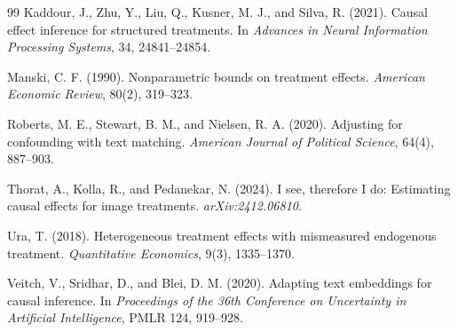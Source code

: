 \documentclass[11pt]{article}
\theoremstyle{definition}
\theoremstyle{plain}
\theoremstyle{remark}
\begin{document}
\begin{thebibliography}{99}
Kaddour, J., Zhu, Y., Liu, Q., Kusner, M. J., and Silva, R. (2021).
Causal effect inference for structured treatments.
In \emph{Advances in Neural Information Processing Systems}, 34, 24841--24854.

Manski, C. F. (1990).
Nonparametric bounds on treatment effects.
\emph{American Economic Review}, 80(2), 319--323.

Roberts, M. E., Stewart, B. M., and Nielsen, R. A. (2020).
Adjusting for confounding with text matching.
\emph{American Journal of Political Science}, 64(4), 887--903.

Thorat, A., Kolla, R., and Pedanekar, N. (2024).
I see, therefore I do: Estimating causal effects for image treatments.
\emph{arXiv:2412.06810}.

Ura, T. (2018).
Heterogeneous treatment effects with mismeasured endogenous treatment.
\emph{Quantitative Economics}, 9(3), 1335--1370.

Veitch, V., Sridhar, D., and Blei, D. M. (2020).
Adapting text embeddings for causal inference.
In \emph{Proceedings of the 36th Conference on Uncertainty in Artificial Intelligence}, PMLR 124, 919--928.
\end{thebibliography}
\end{document}
